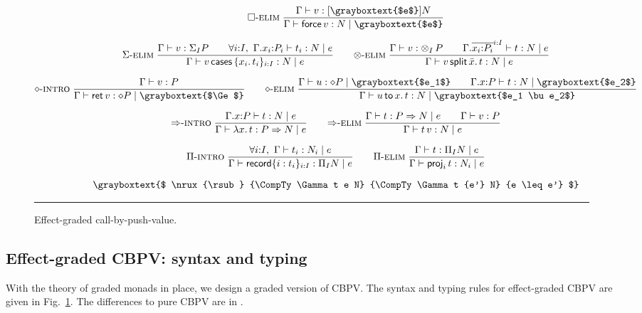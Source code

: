 \documentclass[acmsmall,review,anonymous]{acmart}\settopmatter{printfolios=true,printccs=false,printacmref=false}
\newcommand{\graybox}[1]{\grayboxtext{$#1$}}
\theoremstyle{remark}
\begin{document}
\begin{figure}[htbp]
\begin{gather*}
\qquad
 \nru{\relim\Box}
     {\ValTy \Gamma v {\thunkty {\graybox e} N}
    }{\CompTy \Gamma {\force v} {\graybox e} N}
\\[1.5ex]
 \nru{\relim\GS}
     {\ValTy \Gamma v {\sumt I P} \qquad
      \forall i{:}I,\ \CompTy {\ext \Gamma {x_i} {P_i}} {t_i} e N
    }{\CompTy \Gamma {\caser v {\{x_i.\, t_i\}_{i:I}}} e N}
\qquad
 \nru{\relim\otimes}
     {\ValTy \Gamma v {\tupt I P} \qquad
      \CompTy {\extr \Gamma {\overline{x_i{:}P_i}^{i:I}}} t e N
    }{\CompTy \Gamma {\splits v {\bar x} t} e N}
\\[1.5ex]
 \nru{\rintro\diamond}
     {\ValTy \Gamma v P
    }{\CompTy \Gamma {\ret v} {\graybox \Ge} {\diamond P}}
\qquad
 \nru{\relim\diamond}
     {\CompTy \Gamma u {\graybox{e_1}} {\diamond P} \qquad
      \CompTy {\ext \Gamma x P} t {\graybox{e_2}} N
    }{\CompTy \Gamma {\bind x u t} {\graybox{e_1 \bu e_2}} N}
\\[1.5ex]
 \nru{\rintro\To}
     {\CompTy {\ext \Gamma x P} t e N
    }{\CompTy \Gamma {\lam x t} e {P \To N}}
\qquad
 \nru{\relim\To}
     {\CompTy \Gamma t e {P \To N} \qquad
      \ValTy \Gamma v P
    }{\CompTy \Gamma {\app t v} e N}
\\[1.5ex]
 \nru{\rintro\Pi}
     {\forall i{:}I,\ \CompTy \Gamma {t_i} e {N_i}
    }{\CompTy \Gamma {\trecord {\{i : t_i\}_{i:I}}} e {\rect I N}}
\qquad
 \nru{\relim\Pi}
     {\CompTy \Gamma t e {\rect I N}
    }{\CompTy \Gamma {\proj i t} e  {N_i}}
\\[1.5ex]
\graybox{
 \nrux{\rsub}
      {\CompTy \Gamma t e N}
      {\CompTy \Gamma t {e'} N}
      {e \leq e'}
}
\end{gather*}
\rule{\textwidth}{0.2pt}
  \caption{Effect-graded call-by-push-value.}
  \label{fig:cbpv}
\end{figure}

\subsection{Effect-graded CBPV: syntax and typing}
\label{sec:effect-cbpv}

With the theory of graded monads in place,
we design a graded version of CBPV.
The syntax and typing rules for effect-graded CBPV are given in
Fig.~\ref{fig:cbpv}.  The differences to pure CBPV are in
\graybox{\mbox{gray boxes}}.
\end{document}
